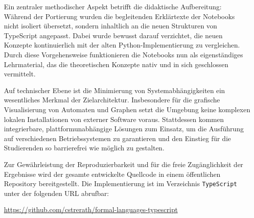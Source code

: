 Ein zentraler methodischer Aspekt betrifft die didaktische Aufbereitung: Während der Portierung wurden die begleitenden Erklärtexte der Notebooks nicht isoliert übersetzt, sondern inhaltlich an die neuen Strukturen von TypeScript angepasst. Dabei wurde bewusst darauf verzichtet, die neuen Konzepte kontinuierlich mit der alten Python-Implementierung zu vergleichen. Durch diese Vorgehensweise funktionieren die Notebooks nun als eigenständiges Lehrmaterial, das die theoretischen Konzepte nativ und in sich geschlossen vermittelt.

Auf technischer Ebene ist die Minimierung von Systemabhängigkeiten ein wesentliches Merkmal der Zielarchitektur. Insbesondere für die grafische Visualisierung von Automaten und Graphen setzt die Umgebung keine komplexen lokalen Installationen von externer Software voraus. Stattdessen kommen integrierbare, plattformunabhängige Lösungen zum Einsatz, um die Ausführung auf verschiedenen Betriebssystemen zu garantieren und den Einstieg für die Studierenden so barrierefrei wie möglich zu gestalten.

Zur Gewährleistung der Reproduzierbarkeit und für die freie Zugänglichkeit der Ergebnisse wird der gesamte entwickelte Quellcode in einem öffentlichen Repository bereitgestellt. Die Implementierung ist im Verzeichnis \texttt{TypeScript} unter der folgenden URL abrufbar:
\begin{center}
    \url{https://github.com/cstrerath/formal-languages-typescript}
\end{center}